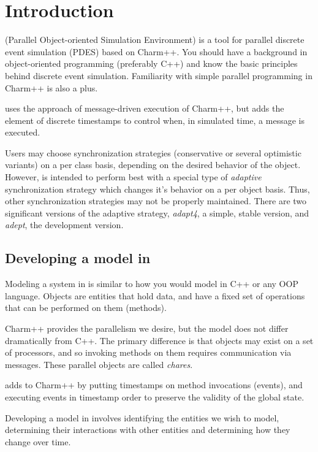 \section{Introduction}

\pose{} (Parallel Object-oriented Simulation Environment) is a tool for
parallel discrete event simulation (PDES) based on Charm++.  You should have
a background in object-oriented programming (preferably C++) and know the
basic principles behind discrete event simulation. Familiarity
with simple parallel programming in Charm++ is also a plus.  

\pose{} uses the approach of message-driven execution of Charm++, but
adds the element of discrete timestamps to control when, in simulated
time, a message is executed.

Users may choose synchronization strategies (conservative or several
optimistic variants) on a per class basis, depending on the desired
behavior of the object.  However, \pose{} is intended to perform best
with a special type of {\it adaptive} synchronization strategy which
changes it's behavior on a per object basis.  Thus, other
synchronization strategies may not be properly maintained.  There are
two significant versions of the adaptive strategy, {\sl adapt4}, a
simple, stable version, and {\sl adept}, the development version.

\subsection{Developing a model in \pose{}}

Modeling a system in \pose{} is similar to how you would model in C++ or
any OOP language.  Objects are entities that hold data, and have a
fixed set of operations that can be performed on them (methods).

Charm++ provides the parallelism we desire, but the model does not
differ dramatically from C++.  The primary difference is that objects
may exist on a set of processors, and so invoking methods on them
requires communication via messages.  These parallel objects are
called {\it chares}.

\pose{} adds to Charm++ by putting timestamps on method invocations
(events), and executing events in timestamp order to preserve the
validity of the global state.

Developing a model in \pose{} involves identifying the entities we
wish to model, determining their interactions with other entities and
determining how they change over time.

